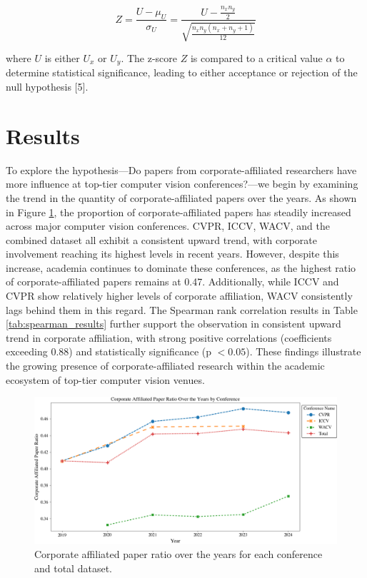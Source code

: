 \documentclass{article}
\begin{document}
\begin{equation}
    Z = \frac{U - \mu_U}{\sigma_U} = \frac{U - \frac{n_x n_y}{2}}{\sqrt{\frac{n_x n_y (n_x + n_y + 1)}{12}}}
\end{equation}

where $U$ is either $U_x$ or $U_y$. The z-score $Z$ is compared to a critical value $\alpha$ to determine statistical significance, leading to either acceptance or rejection of the null hypothesis [5].


\section{Results}
To explore the hypothesis—Do papers from corporate-affiliated researchers have more influence at top-tier computer vision conferences?—we begin by examining the trend in the quantity of corporate-affiliated papers over the years. As shown in Figure \ref{fig:corporate_ratio_graph}, the proportion of corporate-affiliated papers has steadily increased across major computer vision conferences. CVPR, ICCV, WACV, and the combined dataset all exhibit a consistent upward trend, with corporate involvement reaching its highest levels in recent years. However, despite this increase, academia continues to dominate these conferences, as the highest ratio of corporate-affiliated papers remains at 0.47. Additionally, while ICCV and CVPR show relatively higher levels of corporate affiliation, WACV consistently lags behind them in this regard. The Spearman rank correlation results in Table \ref{tab:spearman_results} further support the observation in consistent upward trend in corporate affiliation, with strong positive correlations (coefficients exceeding 0.88) and statistically significance (p $< 0.05$). These findings illustrate the growing presence of corporate-affiliated research within the academic ecosystem of top-tier computer vision venues.

\begin{figure}[ht]
  \centering
  \includegraphics[width=\textwidth]{report/images/corporate_ratio_graph_final.png}  
  \caption{Corporate affiliated paper ratio over the years for each conference and total dataset.}
  \label{fig:corporate_ratio_graph}
\end{figure}
\end{document}
